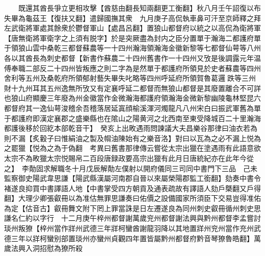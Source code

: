 　　既還其酋長爭立更相攻擊【酋慈由翻長知兩翻更工衡翻】秋八月壬午詔復以布失畢為龜茲王【復扶又翻】遣歸國撫其衆　九月庚子高侃執車鼻可汗至京師釋之拜左武衛將軍處其餘衆於鬱督軍山【處昌呂翻】置狼山都督府以統之以高侃為衛將軍【唐無衛將軍衛字之上須有脱字】於是突厥盡為封内之臣分置單于瀚海二都護府單于領狼山雲中桑乾三都督蘇農等一十四州瀚海領瀚海金徽新黎等七都督仙萼等八州各以其酋長為刺史都督【新書作蘇農二十四州舊書作一十四州又攷是後調露元年温傅奉職二部反二十四州皆叛應之則二字為是然單于都護府所領見於史者蘇農等四州舍利等五州及桑乾府所領郁射藝失畢失叱略等四州呼延府所領賀魯葛邏跌等三州財十九州耳其五州逸無所攷又有定襄呼延二都督而無狼山都督是其廢置離合不可詳也狼山府顯慶三年廢為州金徽當作金微瀚海都護府領瀚海金微新黎幽陵龜林堅昆六都督府其一逸仙萼浚稽余吾稽落居延寘顔榆溪渾河燭龍凡八州宋白曰振武軍舊為單于都護府即漢定襄郡之盛樂縣也在隂山之陽黄河之北西南至東受降城百二十里瀚海都護後移於回紇本部乾音干】　癸亥上出畋遇雨問諫議大夫昌樂谷那律曰油衣若為則不漏【炙轂子曰惟絹油之製及㡌油陳始有之樂音洛】對曰以瓦為之必不漏上悦為之罷獵【悦為之為于偽翻　考異曰舊書那律傳云嘗從太宗出獵在塗遇雨有此語意欲太宗不為畋獵太宗悦賜帛二百段唐録政要高宗出獵有此月日唐統紀亦在此年今從之】　李勣固求解職冬十月戊辰解勣左僕射以開府儀同三司同中書門下三品　己未監察御史陽武韋思謙【陽武縣漢屬河南郡自晉以來屬榮陽郡監工銜翻】劾奏中書令褚遂良抑買中書譯語人地【中書掌受四方朝貢及通表疏故有譯語人劾戶槩翻又戶得翻】大理少卿張叡冊以為准估無罪思謙奏曰佑價之設備國家所須臣下交易豈得准佑為定【估音古】叡冊舞文附下罔上罪當誅是日左遷遂良為同州刺史叡冊循州刺史思謙名仁約以字行　十二月庚午梓州都督謝萬歲兖州都督謝法興與黔州都督李孟嘗討琰州叛獠【梓州當作牂州武德三年牂柯蠻酋謝龍羽降以其地置牂州兖州當作充州武德三年以牂柯蠻别部置琰州亦蠻州貞觀四年置皆屬黔州都督府黔音琴獠魯皓翻】萬歲法興入洞招慰為獠所殺

